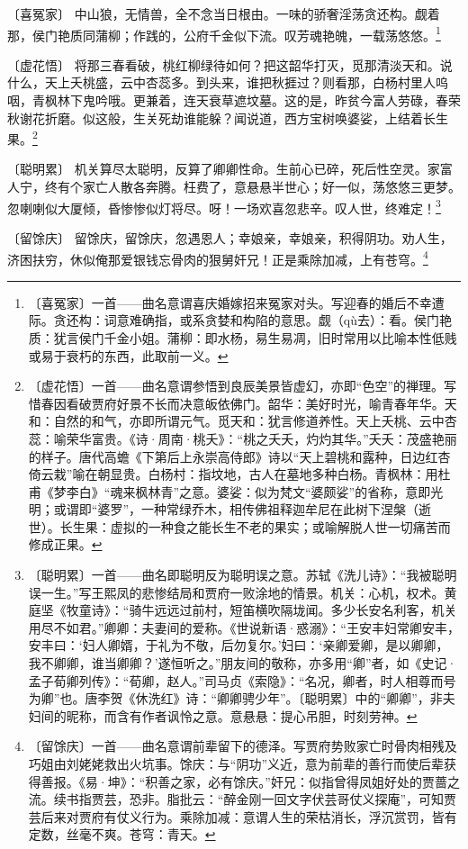 {    \par 〔喜冤家〕 中山狼，无情兽，全不念当日根由。一味的骄奢淫荡贪还构。觑着那，侯门艳质同蒲柳；作践的，公府千金似下流。叹芳魂艳魄，一载荡悠悠。\footnote{〔喜冤家〕一首——曲名意谓喜庆婚嫁招来冤家对头。写迎春的婚后不幸遭际。贪还构：词意难确指，或系贪婪和构陷的意思。觑（qù去）：看。侯门艳质：犹言侯门千金小姐。蒲柳：即水杨，易生易凋，旧时常用以比喻本性低贱或易于衰朽的东西，此取前一义。}
    \par 〔虚花悟〕 将那三春看破，桃红柳绿待如何？把这韶华打灭，觅那清淡天和。说什么，天上夭桃盛，云中杏蕊多。到头来，谁把秋捱过？则看那，白杨村里人呜咽，青枫林下鬼吟哦。更兼着，连天衰草遮坟墓。这的是，昨贫今富人劳碌，春荣秋谢花折磨。似这般，生关死劫谁能躲？闻说道，西方宝树唤婆娑，上结着长生果。\footnote{〔虚花悟〕一首——曲名意谓参悟到良辰美景皆虚幻，亦即“色空”的禅理。写惜春因看破贾府好景不长而决意皈依佛门。韶华：美好时光，喻青春年华。天和：自然的和气，亦即所谓元气。觅天和：犹言修道养性。天上夭桃、云中杏蕊：喻荣华富贵。《诗·周南·桃夭》：“桃之夭夭，灼灼其华。”夭夭：茂盛艳丽的样子。唐代高蟾《下第后上永崇高侍郎》诗以“天上碧桃和露种，日边红杏倚云栽”喻在朝显贵。白杨村：指坟地，古人在墓地多种白杨。青枫林：用杜甫《梦李白》“魂来枫林青”之意。婆娑：似为梵文“婆颇娑”的省称，意即光明；或谓即“婆罗”，一种常绿乔木，相传佛祖释迦牟尼在此树下涅槃（逝世）。长生果：虚拟的一种食之能长生不老的果实；或喻解脱人世一切痛苦而修成正果。}
    \par 〔聪明累〕 机关算尽太聪明，反算了卿卿性命。生前心已碎，死后性空灵。家富人宁，终有个家亡人散各奔腾。枉费了，意悬悬半世心；好一似，荡悠悠三更梦。忽喇喇似大厦倾，昏惨惨似灯将尽。呀！一场欢喜忽悲辛。叹人世，终难定！\footnote{〔聪明累〕一首——曲名即聪明反为聪明误之意。苏轼《洗儿诗》：“我被聪明误一生。”写王熙凤的悲惨结局和贾府一败涂地的情景。机关：心机，权术。黄庭坚《牧童诗》：“骑牛远远过前村，短笛横吹隔垅闻。多少长安名利客，机关用尽不如君。”卿卿：夫妻间的爱称。《世说新语·惑溺》：“王安丰妇常卿安丰，安丰曰：‘妇人卿婿，于礼为不敬，后勿复尔。’妇曰：‘亲卿爱卿，是以卿卿，我不卿卿，谁当卿卿？’遂恒听之。”朋友间的敬称，亦多用“卿”者，如《史记·孟子荀卿列传》：“荀卿，赵人。”司马贞《索隐》：“名况，卿者，时人相尊而号为卿”也。唐李贺《休洗红》诗：“卿卿骋少年”。〔聪明累〕中的“卿卿”，非夫妇间的昵称，而含有作者讽怜之意。意悬悬：提心吊胆，时刻劳神。}
    \par 〔留馀庆〕 留馀庆，留馀庆，忽遇恩人；幸娘亲，幸娘亲，积得阴功。劝人生，济困扶穷，休似俺那爱银钱忘骨肉的狠舅奸兄！正是乘除加减，上有苍穹。\footnote{〔留馀庆〕一首——曲名意谓前辈留下的德泽。写贾府势败家亡时骨肉相残及巧姐由刘姥姥救出火坑事。馀庆：与“阴功”义近，意为前辈的善行而使后辈获得善报。《易·坤》：“积善之家，必有馀庆。”奸兄：似指曾得凤姐好处的贾蔷之流。续书指贾芸，恐非。脂批云：“醉金刚一回文字伏芸哥仗义探庵”，可知贾芸后来对贾府有仗义行为。乘除加减：意谓人生的荣枯消长，浮沉赏罚，皆有定数，丝毫不爽。苍穹：青天。}
}
